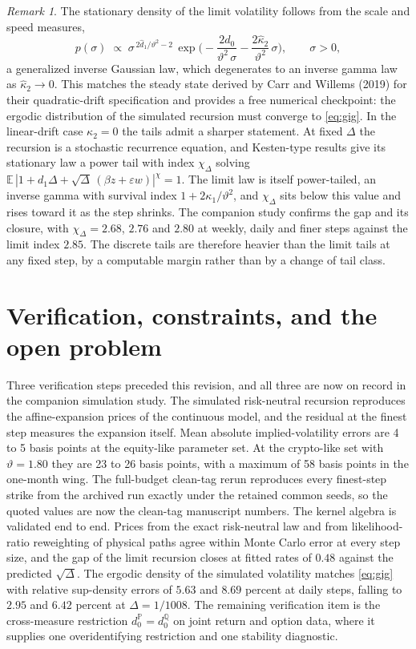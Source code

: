 \documentclass[11pt]{article}
\theoremstyle{remark}
\newtheorem{remark}[theorem]{Remark}
\newcommand{\E}{\mathbb{E}}
\newcommand{\Pm}{\mathbb{P}}
\newcommand{\Qm}{\mathbb{Q}}
\newcommand{\Dt}{\Delta}
\begin{document}
\begin{remark}\label{rem:gig}
The stationary density of the limit volatility follows from the scale and
speed measures,
\begin{equation}\label{eq:gig}
p(\sigma)\;\propto\;
\sigma^{\,2\hat d_1/\vartheta^2-2}\,
\exp\!\Big(-\frac{2d_0}{\vartheta^2\,\sigma}
-\frac{2\hat\kappa_2}{\vartheta^2}\,\sigma\Big),
\qquad \sigma>0,
\end{equation}
a generalized inverse Gaussian law, which degenerates to an inverse gamma
law as $\hat\kappa_2\to0$.
This matches the steady state derived by Carr and Willems (2019) for their
quadratic-drift specification and provides a free numerical checkpoint: the
ergodic distribution of the simulated recursion must converge to
\eqref{eq:gig}.
In the linear-drift case $\kappa_2=0$ the tails admit a sharper statement.
At fixed $\Dt$ the recursion is a stochastic recurrence equation, and
Kesten-type results give its stationary law a power tail with index
$\chi_\Dt$ solving
$\E\,|1+d_1\Dt+\sqrt{\Dt}\,(\beta z+\varepsilon w)|^{\chi}=1$.
The limit law is itself power-tailed, an inverse gamma with survival index
$1+2\kappa_1/\vartheta^2$, and $\chi_\Dt$ sits below this value and rises
toward it as the step shrinks.
The companion study confirms the gap and its closure, with
$\chi_\Dt=2.68$, $2.76$ and $2.80$ at weekly, daily and finer steps
against the limit index $2.85$.
The discrete tails are therefore heavier than the limit tails at any
fixed step, by a computable margin rather than by a change of tail class.
\end{remark}

\section{Verification, constraints, and the open problem}\label{sec:open}

Three verification steps preceded this revision, and all three are now on
record in the companion simulation study.
The simulated risk-neutral recursion reproduces the affine-expansion
prices of the continuous model, and the residual at the finest step
measures the expansion itself.
Mean absolute implied-volatility errors are 4 to 5 basis points at the
equity-like parameter set.
At the crypto-like set with $\vartheta=1.80$ they are 23 to 26 basis
points, with a maximum of 58 basis points in the one-month wing.
The full-budget clean-tag rerun reproduces every finest-step strike from the
archived run exactly under the retained common seeds, so the quoted values
are now the clean-tag manuscript numbers.
The kernel algebra is validated end to end.
Prices from the exact risk-neutral law and from likelihood-ratio
reweighting of physical paths agree within Monte Carlo error at every
step size, and the gap of the limit recursion closes at fitted rates of
$0.48$ against the predicted $\sqrt{\Dt}$.
The ergodic density of the simulated volatility matches \eqref{eq:gig}
with relative sup-density errors of $5.63$ and $8.69$ percent at daily
steps, falling to $2.95$ and $6.42$ percent at $\Dt=1/1008$.
The remaining verification item is the cross-measure restriction
$d_0^{\Pm}=d_0^{\Qm}$ on joint return and option data, where it supplies
one overidentifying restriction and one stability diagnostic.
\end{document}
